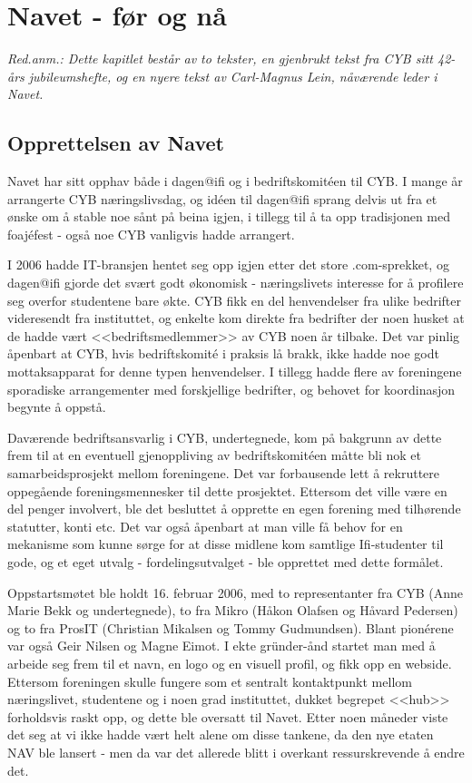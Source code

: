 \chapter[Navet]{Navet - før og nå}

\textit{Red.anm.: Dette kapitlet består av to tekster, en gjenbrukt tekst fra CYB sitt 42-års jubileumshefte, og en nyere tekst av Carl-Magnus Lein, nåværende leder i Navet.}

\section{Opprettelsen av Navet}

\author{Skrevet av Anna Dahl}

Navet har sitt opphav både i dagen@ifi og i bedriftskomitéen til CYB. I mange år arrangerte CYB næringslivsdag, og idéen til dagen@ifi sprang delvis ut fra et ønske om å stable noe sånt på beina igjen, i tillegg til å ta opp tradisjonen med foajéfest - også noe CYB vanligvis hadde arrangert.

I 2006 hadde IT-bransjen hentet seg opp igjen etter det store .com-sprekket, og dagen@ifi gjorde det svært godt økonomisk - næringslivets interesse for å profilere seg overfor studentene bare økte. CYB fikk en del henvendelser fra ulike bedrifter videresendt fra instituttet, og enkelte kom direkte fra bedrifter der noen husket at de hadde vært <<bedriftsmedlemmer>> av CYB noen år tilbake. Det var pinlig åpenbart at CYB, hvis bedriftskomité i praksis lå brakk, ikke hadde noe godt mottaksapparat for denne typen henvendelser. I tillegg hadde flere av foreningene sporadiske arrangementer med forskjellige bedrifter, og behovet for koordinasjon begynte å oppstå.

Daværende bedriftsansvarlig i CYB, undertegnede, kom på bakgrunn av dette frem til at en eventuell gjenoppliving av bedriftskomitéen måtte bli nok et samarbeidsprosjekt mellom foreningene. Det var forbausende lett å rekruttere oppegående foreningsmennesker til dette prosjektet. Ettersom det ville være en del penger involvert, ble det besluttet å opprette en egen forening med tilhørende statutter, konti etc. Det var også åpenbart at man ville få behov for en mekanisme som kunne sørge for at disse midlene kom samtlige Ifi-studenter til gode, og et eget utvalg - fordelingsutvalget - ble opprettet med dette formålet.

Oppstartsmøtet ble holdt 16. februar 2006, med to representanter fra CYB (Anne Marie Bekk og undertegnede), to fra Mikro (Håkon Olafsen og Håvard Pedersen) og to fra ProsIT (Christian Mikalsen og Tommy Gudmundsen). Blant pionérene var også Geir Nilsen og Magne Eimot. I ekte gründer-ånd startet man med å arbeide seg frem til et navn, en logo og en visuell profil, og fikk opp en webside. Ettersom foreningen skulle fungere som et sentralt kontaktpunkt mellom næringslivet, studentene og i noen grad instituttet, dukket begrepet <<hub>> forholdsvis raskt opp,
og dette ble oversatt til Navet. Etter noen måneder viste det seg at vi ikke hadde vært helt alene om disse tankene, da den nye etaten NAV ble lansert - men da var det allerede blitt i overkant ressurskrevende å endre det.

